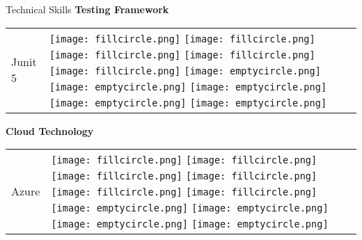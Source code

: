 \documentclass{resume}
\begin{document}
\begin{rSection}{Technical Skills}
{\bf Testing Framework}
\begin{table}[h!]
  \begin{tabular}{p{10cm}p{6cm}}
  Junit 5 & 
  \texttt{[image: fillcircle.png]} 
  \texttt{[image: fillcircle.png]} 
  \texttt{[image: fillcircle.png]}
  \texttt{[image: fillcircle.png]} 
  \texttt{[image: fillcircle.png]}
  \texttt{[image: emptycircle.png]} 
  \texttt{[image: emptycircle.png]}
  \texttt{[image: emptycircle.png]} 
  \texttt{[image: emptycircle.png]} 
  \texttt{[image: emptycircle.png]} \\
  \end{tabular}
\end{table}

{\bf Cloud Technology }
\begin{table}[h!]
  \begin{tabular}{p{10cm}p{6cm}}
  Azure & 
  \texttt{[image: fillcircle.png]} 
  \texttt{[image: fillcircle.png]} 
  \texttt{[image: fillcircle.png]}
  \texttt{[image: fillcircle.png]} 
  \texttt{[image: fillcircle.png]}
  \texttt{[image: fillcircle.png]} 
  \texttt{[image: emptycircle.png]}
  \texttt{[image: emptycircle.png]} 
  \texttt{[image: emptycircle.png]} 
  \texttt{[image: emptycircle.png]} \\
  \end{tabular}
\end{table}


\end{rSection}
\end{document}
